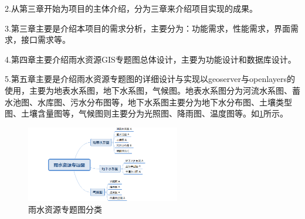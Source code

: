 2.从第三章开始为项目的主体介绍，分为三章来介绍项目实现的成果。

3.第三章主要是介绍本项目的需求分析，主要分为：功能需求，性能需求，界面需求，接口需求等。

4.第四章主要介绍雨水资源GIS专题图总体设计，主要为功能设计和数据库设计。

5.第五章主要是介绍雨水资源专题图的详细设计与实现以geoserver与openlayers的使用，主要为地表水系图，地下水系图，气候图。地表水系图分为河流水系图、蓄水池图、水库图、污水分布图等，地下水系图主要分为地下水分布图、土壤类型图、土壤含量图等，气候图则主要分为光照图、降雨图、温度图等。如\ref{fig:classify_rain}所示。
\begin{figure}[!htb]%
  \centering
  \includegraphics[width=0.60\textwidth,height=0.14\textheight]{figs/tree_1.png}
  \caption{雨水资源专题图分类}
  \label{fig:classify_rain}
\end{figure}

%

%

%
%





